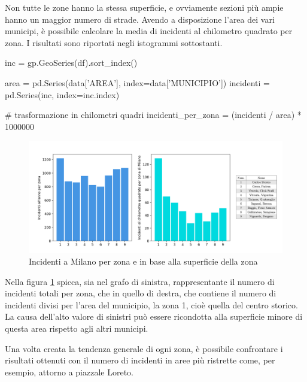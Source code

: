 \documentclass[a4paper,12pt]{report}
\begin{document}
Non tutte le zone hanno la stessa superficie, e ovviamente sezioni più ampie hanno un maggior 
numero di strade. Avendo a disposizione l'area dei vari municipi, 
è possibile calcolare la media di incidenti al chilometro quadrato per zona.
I risultati sono riportati negli istogrammi sottostanti.

\begin{code}    
inc = gp.GeoSeries(df).sort_index()

area = pd.Series(data['AREA'], index=data['MUNICIPIO'])
incidenti = pd.Series(inc, index=inc.index)

# trasformazione in chilometri quadri
incidenti_per_zona = (incidenti / area) * 1000000 
\end{code}

\begin{figure}
    \includegraphics[width=\linewidth]{../src/municipi_milano/incidenti_superf.png}
    \caption{Incidenti a Milano per zona e in base alla superficie della zona}
    \label{fig:incidenti-chilometro}
\end{figure}

Nella figura \ref{fig:incidenti-chilometro} spicca, sia nel grafo di sinistra, rappresentante 
il numero di incidenti totali per zona, che in 
quello di destra, che contiene il numero di incidenti divisi per l'area del municipio, 
la zona 1, cioè quella del centro storico.
La causa dell'alto valore di sinistri può essere ricondotta alla superficie minore 
di questa area rispetto agli altri municipi.

Una volta creata la tendenza generale di ogni zona, è possibile confrontare i risultati 
ottenuti con il numero di incidenti in aree più ristrette come, per esempio, 
attorno a piazzale Loreto.
\end{document}
